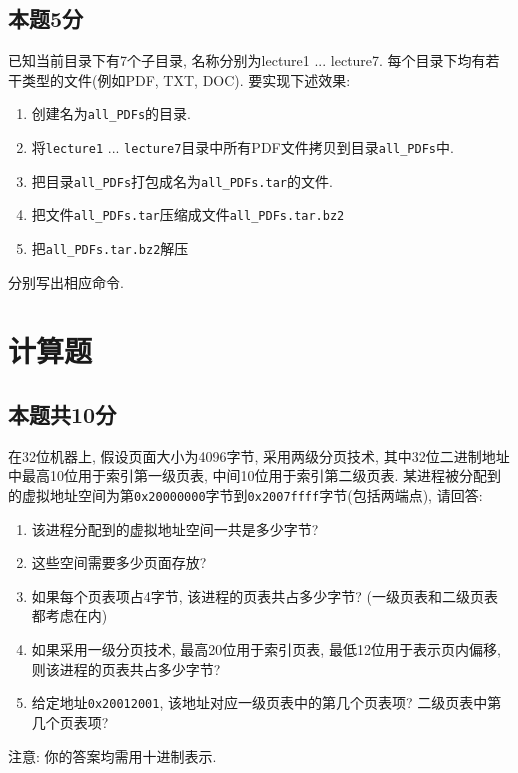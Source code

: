 \documentclass[a4paper,11pt]{article}
\begin{document}
\begin{CJK*}{UTF8}{gbsn}
\subsection{本题5分}
已知当前目录下有7个子目录, 名称分别为lecture1 ... lecture7. 每个目录下均有若干类型的文件(例如PDF, TXT, DOC).
要实现下述效果:
\begin{enumerate}
\item 创建名为\verb|all_PDFs|的目录.
\item 将\verb|lecture1| ... \verb|lecture7|目录中所有PDF文件拷贝到目录\verb|all_PDFs|中.
\item 把目录\verb|all_PDFs|打包成名为\verb|all_PDFs.tar|的文件.
\item 把文件\verb|all_PDFs.tar|压缩成文件\verb|all_PDFs.tar.bz2|
\item 把\verb|all_PDFs.tar.bz2|解压 
\end{enumerate}
分别写出相应命令.
\\[1.5in]

\section{计算题}
\subsection{本题共10分}
在32位机器上, 假设页面大小为4096字节, 采用两级分页技术, 其中32位二进制地址中最高10位用于索引第一级页表,
中间10位用于索引第二级页表. 某进程被分配到的虚拟地址空间为第\verb|0x20000000|字节到\verb|0x2007ffff|字节(包括两端点), 
请回答:
\begin{enumerate}
\item 该进程分配到的虚拟地址空间一共是多少字节? 
\item 这些空间需要多少页面存放? 
\item 如果每个页表项占4字节, 该进程的页表共占多少字节? (一级页表和二级页表都考虑在内)
\item 如果采用一级分页技术, 最高20位用于索引页表, 最低12位用于表示页内偏移, 则该进程的页表共占多少字节?
\item 给定地址\verb|0x20012001|, 该地址对应一级页表中的第几个页表项? 二级页表中第几个页表项?
\end{enumerate}
注意: 你的答案均需用十进制表示.
\\[2in]



\end{CJK*}
\end{document}
